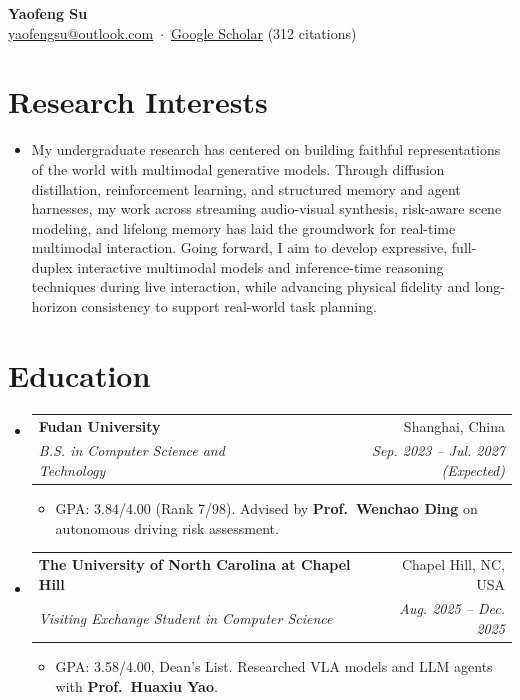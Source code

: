 \documentclass[a4paper,11pt]{article}
\makeatletter
\newcommand{\resumeItem}[1]{
  \item\small{#1}
}
\newcommand{\resumeSubheading}[4]{
  \item
    \begin{tabular*}{\linewidth}[t]{l@{\extracolsep{\fill}}r}
      \textbf{#1} & \small #2 \\
      \textit{\small#3} & \textit{\small #4} \\
    \end{tabular*}\vspace{-3pt}
}
\newcommand{\resumeSubHeadingListStart}{\begin{itemize}[leftmargin=0.10in, label={}, topsep=1pt, itemsep=4pt]}
\newcommand{\resumeSubHeadingListEnd}{\end{itemize}}
\newcommand{\resumeItemListStart}{\begin{itemize}[leftmargin=0.18in, topsep=2.5pt, itemsep=2pt, parsep=0pt]}
\newcommand{\resumeItemListEnd}{\end{itemize}}
\makeatother
\begin{document}
\begin{center}
    {\Huge\textbf{Yaofeng Su}} \\[4pt]
    \small
    \href{mailto:yaofengsu@outlook.com}{\underline{yaofengsu@outlook.com}} \,$\cdot$\,
    \href{https://scholar.google.com/citations?user=ASn1XLAAAAAJ}{\underline{Google Scholar}} (312 citations)
\end{center}
\vspace{-4pt}

\section{Research Interests}
\begin{itemize}[leftmargin=0.10in, label={}, topsep=0pt]
\item\small My undergraduate research has centered on building faithful representations of the world with multimodal generative models. Through diffusion distillation, reinforcement learning, and structured memory and agent harnesses, my work across streaming audio-visual synthesis, risk-aware scene modeling, and lifelong memory has laid the groundwork for real-time multimodal interaction. Going forward, I aim to develop expressive, full-duplex interactive multimodal models and inference-time reasoning techniques during live interaction, while advancing physical fidelity and long-horizon consistency to support real-world task planning.
\end{itemize}

\section{Education}
  \resumeSubHeadingListStart
    \resumeSubheading
      {Fudan University}{Shanghai, China}
      {B.S. in Computer Science and Technology}{Sep. 2023 -- Jul. 2027 (Expected)}
      \resumeItemListStart
        \resumeItem{GPA: 3.84/4.00 (Rank 7/98). Advised by \textbf{Prof.\ Wenchao Ding} on autonomous driving risk assessment.}
      \resumeItemListEnd
    \resumeSubheading
      {The University of North Carolina at Chapel Hill}{Chapel Hill, NC, USA}
      {Visiting Exchange Student in Computer Science}{Aug. 2025 -- Dec. 2025}
      \resumeItemListStart
        \resumeItem{GPA: 3.58/4.00, Dean's List. Researched VLA models and LLM agents with \textbf{Prof.\ Huaxiu Yao}.}
      \resumeItemListEnd
  \resumeSubHeadingListEnd
\end{document}
